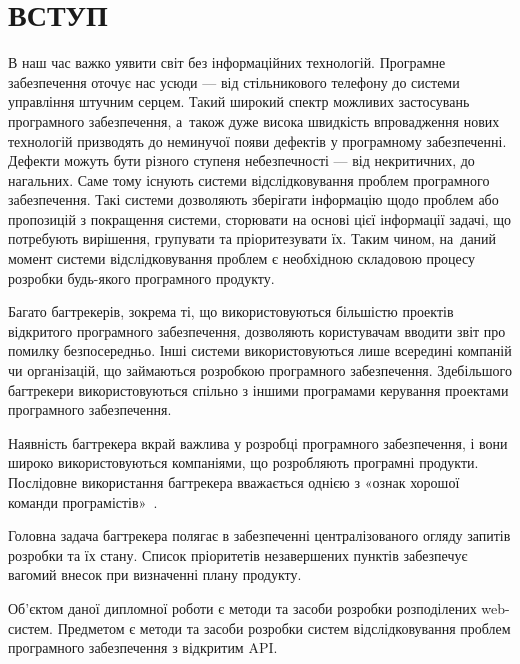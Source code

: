 \documentclass[../main.tex]{subfiles}
\begin{document}
\chapter*{ВСТУП}

В наш час важко уявити світ без інформаційних технологій. Програмне забезпечення оточує нас усюди — від стільникового телефону до системи управління штучним серцем. Такий широкий спектр можливих застосувань програмного забезпечення, а~також дуже висока швидкість впровадження нових технологій призводять до неминучої появи дефектів у програмному забезпеченні. Дефекти можуть бути різного ступеня небезпечності — від некритичних, до нагальних. Саме тому існують системи відслідковування проблем програмного забезпечення. Такі системи дозволяють зберігати інформацію щодо проблем або пропозицій з покращення системи, сторювати на основі цієї інформації задачі, що потребують вирішення, групувати та пріоритезувати їх. Таким чином, на~даний момент системи відслідковування проблем є необхідною складовою процесу розробки будь-якого програмного продукту.

Багато багтрекерів, зокрема ті, що використовуються більшістю проектів відкритого програмного забезпечення, дозволяють користувачам вводити звіт про помилку безпосередньо. Інші системи використовуються лише всередині компаній чи організацій, що займаються розробкою програмного забезпечення. Здебільшого багтрекери використовуються спільно з іншими програмами керування проектами програмного забезпечення.

Наявність багтрекера вкрай важлива у розробці програмного забезпечення, і вони широко використовуються компаніями, що розробляють програмні продукти. Послідовне використання багтрекера вважається однією з «ознак хорошої команди програмістів»~\cite{painless_bug_tracking}.

Головна задача багтрекера полягає в забезпеченні централізованого огляду запитів розробки та їх стану. Список пріоритетів незавершених пунктів забезпечує вагомий внесок при визначенні плану продукту.

Об'єктом даної дипломної роботи є методи та засоби розробки розподілених web-систем. Предметом є методи та засоби розробки систем відслідковування проблем програмного забезпечення з відкритим API.
\end{document}
